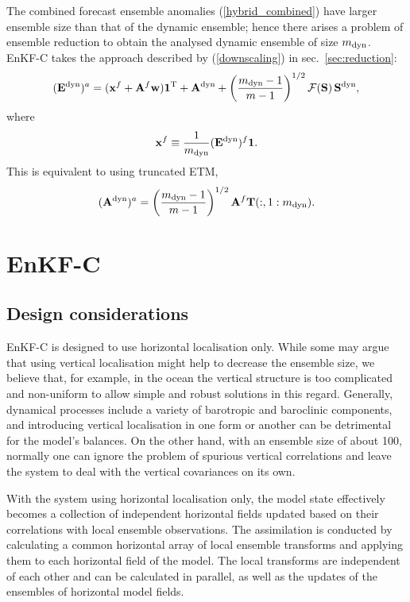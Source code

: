 \documentclass[11pt]{report}
\newcommand{\mb} {\mathbf}
\newcommand{\T}{^{\tiny \mathrm T}}
\newcommand*\suptxt[1]{^{\textnormal{#1}}}
\newcommand*\subtxt[1]{_{\textnormal{#1}}}
\begin{document}
The combined forecast ensemble anomalies (\ref{hybrid_combined}) have larger ensemble size than that of the dynamic ensemble; hence there arises a problem of ensemble reduction to obtain the analysed dynamic ensemble of size $m\subtxt{dyn}$.
EnKF-C takes the approach described by (\ref{downscaling}) in sec.~\ref{sec:reduction}:
\begin{align}
  \label{hybrid_update}
  (\mb E\suptxt{dyn})^a = (\mb x^f + \mb A^f \mb w) \mb 1\T + \mb A\suptxt{dyn} + \left(\frac{m\subtxt{dyn} - 1}{m - 1}\right)^{1/2} \mathcal F(\mb S) \, \mb S\suptxt{dyn},
\end{align}
where
\begin{align}
\mb x^f \equiv \frac{1}{m\subtxt{dyn}} (\mb E\suptxt{dyn})^f \mb 1.
\end{align}
This is equivalent to using truncated ETM, 
\begin{align*}
  (\mb A\suptxt{dyn})^a = \left(\frac{m\subtxt{dyn} - 1}{m - 1}\right)^{1/2} \mb A^f \mb T(:, 1 : m\subtxt{dyn}).
\end{align*}

\chapter{EnKF-C}
\label{ch:enkf-c}

\section{Design considerations}

EnKF-C is designed to use horizontal localisation only.
While some may argue that using vertical localisation might help to decrease the ensemble size, we believe that, for example, in the ocean the vertical structure is too complicated and non-uniform to allow simple and robust solutions in this regard.
Generally, dynamical processes include a variety of barotropic and baroclinic components, and introducing vertical localisation in one form or another can be detrimental for the model's balances.
On the other hand, with an ensemble size of about 100, normally one can ignore the problem of spurious vertical correlations and leave the system to deal with the vertical covariances on its own.

With the system using horizontal localisation only, the model state effectively becomes a collection of independent horizontal fields updated based on their correlations with local ensemble observations.
The assimilation is conducted by calculating a common horizontal array of local ensemble transforms and applying them to each horizontal field of the model.
The local transforms are independent of each other and can be calculated in parallel, as well as the updates of the ensembles of horizontal model fields.
\end{document}
